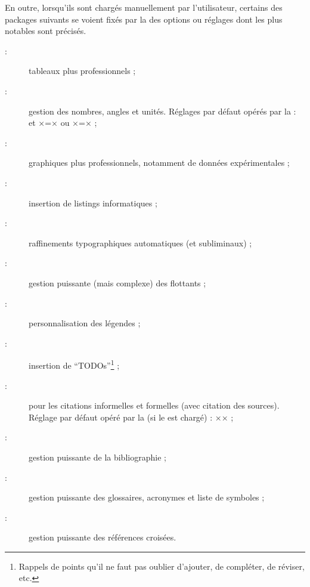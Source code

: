 En outre, lorsqu'ils sont chargés manuellement par l'utilisateur, certains des
packages suivants se voient fixés par la \yatcl{} des options ou réglages dont
les plus notables sont précisés.

\begin{description}
\item[ :] tableaux plus professionnels ;
\item[ :] gestion des nombres, angles et unités. Réglages par
  défaut opérés par la \yatcl :  et
  ×=× ou
  ×=×\selonlangue{} ;
\item[ :] graphiques plus professionnels,
  notamment de données expérimentales ;
\item[ :] insertion de listings informatiques ;
\item[ :] raffinements typographiques
  automatiques (et subliminaux) ;
\item[ :] gestion puissante (mais complexe) des
  flottants ;
\item[ :] personnalisation des légendes ;
\item[ :] insertion de
  \foreignquote{english}{TODOs}\footnote{Rappels de points qu'il ne
    faut pas oublier d'ajouter, de compléter, de réviser, etc.} ;
\item[ :] pour les citations informelles et formelles (avec
  citation des sources). Réglage par défaut opéré par la \yatcl (si le
   est chargé) : ×\SetCiteCommand{\autocite}× ;
\item[ :] gestion puissante de la bibliographie ;
\item[ :] gestion puissante des glossaires,
  acronymes et liste de symboles ;
\item[ :] gestion puissante des références croisées.
\end{description}

%
\iffalse
\fi
